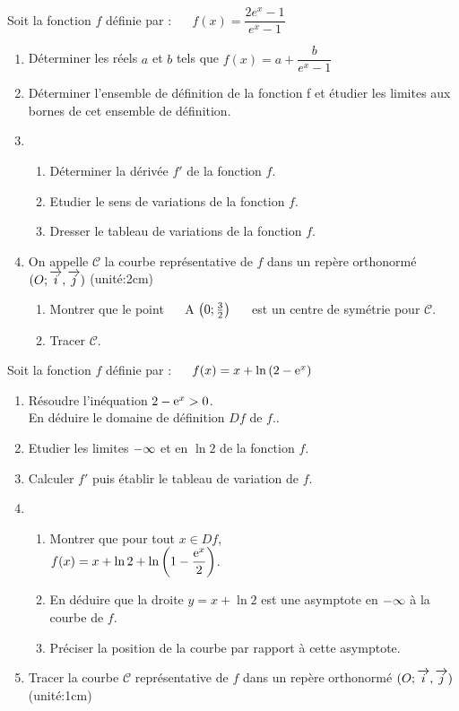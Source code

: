 \begin{exercice}
 Soit la fonction $ f $ définie par : ~~ $ f(x)= \dfrac{2e^{x}-1}{e^{x}-1} $ 
   \begin{enumerate}
   \item Déterminer les réels $a $ et $b $ tels que $ f(x)= a+\dfrac{b}{e^{x}-1} $
   \item  Déterminer l'ensemble de définition de la fonction f et étudier les limites aux bornes de cet ensemble de définition. 
   \item
   \begin{enumerate}
   \item  Déterminer la dérivée $ f' $ de la fonction $ f $.
   \item Etudier le sens de variations de la fonction $ f $.
   \item Dresser le tableau de variations de la fonction $ f $.      
   \end{enumerate}
   \item  On appelle   $ \mathcal{C} $ la courbe représentative de $ f $ dans un repère orthonormé $ (O ;\overrightarrow{i},\overrightarrow{j}) $ (unité:2cm)
   \begin{enumerate}
   \item  Montrer que le point  ~~ A $\left(0 ;\frac{3}{2} \right)$  ~~  est un centre de symétrie  pour $ \mathcal{C} $.
   \item Tracer $ \mathcal{C} $.
\end{enumerate}    
   \end{enumerate}
   
   
\end{exercice}


\begin{exercice}
 Soit la fonction $ f $ définie par : ~~ $ f(x)= x+\ln\left(2-\mathrm{e}^{x}\right) $ 
   \begin{enumerate}
   \item Résoudre l'inéquation $ 2-\mathrm{e}^{x}> 0$.\\ En déduire le domaine de définition  $ Df $  de $ f. $.
   \item Etudier les limites $-\infty $ et en  $ \ln 2$  de la fonction $ f $. 
   \item  Calculer   $ f' $   puis établir le tableau de variation de $ f. $
   \item
   \begin{enumerate}
   \item  Montrer que pour tout $ x\in Df $, \\ $ f(x)=x+\ln 2+\ln\left(1-\dfrac{\mathrm{e}^{x}}{2}\right)$.
   \item En déduire que la droite $ y= x+\ln 2 $  est une asymptote en $-\infty $  à la courbe de $ f. $
   \item Préciser la position de la courbe par rapport à cette asymptote.    
   \end{enumerate}
   \item Tracer la courbe   $ \mathcal{C} $  représentative de $ f $ dans un repère orthonormé $ (O ;\overrightarrow{i},\overrightarrow{j}) $ (unité:1cm)
      
   \end{enumerate}
   
   
\end{exercice}


